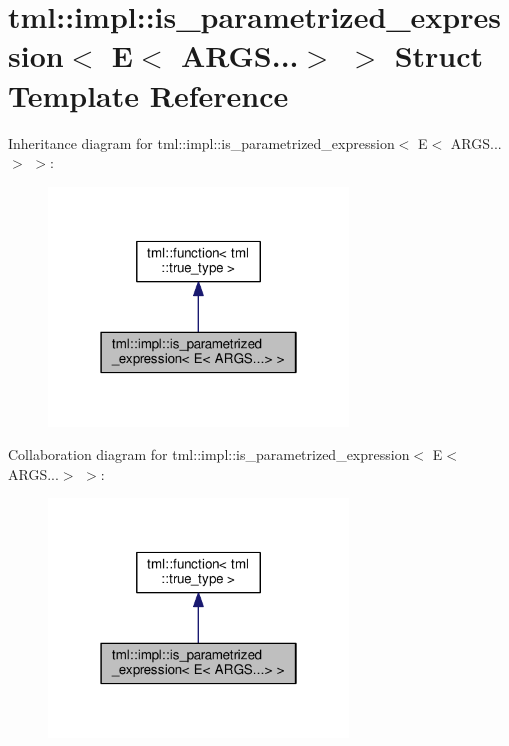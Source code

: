 \hypertarget{structtml_1_1impl_1_1is__parametrized__expression_3_01_e_3_01_a_r_g_s_8_8_8_4_01_4}{\section{tml\+:\+:impl\+:\+:is\+\_\+parametrized\+\_\+expression$<$ E$<$ A\+R\+G\+S...$>$ $>$ Struct Template Reference}
\label{structtml_1_1impl_1_1is__parametrized__expression_3_01_e_3_01_a_r_g_s_8_8_8_4_01_4}
}


Inheritance diagram for tml\+:\+:impl\+:\+:is\+\_\+parametrized\+\_\+expression$<$ E$<$ A\+R\+G\+S...$>$ $>$\+:
\nopagebreak
\begin{figure}[H]
\begin{center}
\leavevmode
\includegraphics[width=226pt]{structtml_1_1impl_1_1is__parametrized__expression_3_01_e_3_01_a_r_g_s_8_8_8_4_01_4__inherit__graph}
\end{center}
\end{figure}


Collaboration diagram for tml\+:\+:impl\+:\+:is\+\_\+parametrized\+\_\+expression$<$ E$<$ A\+R\+G\+S...$>$ $>$\+:
\nopagebreak
\begin{figure}[H]
\begin{center}
\leavevmode
\includegraphics[width=226pt]{structtml_1_1impl_1_1is__parametrized__expression_3_01_e_3_01_a_r_g_s_8_8_8_4_01_4__coll__graph}
\end{center}
\end{figure}

